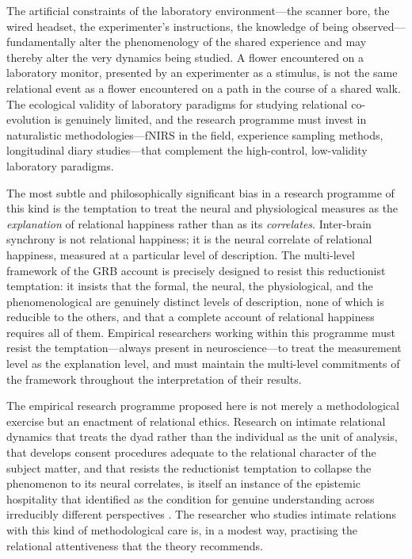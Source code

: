  The artificial constraints of the laboratory environment---the scanner bore, the wired headset, the experimenter's instructions, the knowledge of being observed---fundamentally alter the phenomenology of the shared experience and may thereby alter the very dynamics being studied. A flower encountered on a laboratory monitor, presented by an experimenter as a stimulus, is not the same relational event as a flower encountered on a path in the course of a shared walk. The ecological validity of laboratory paradigms for studying relational co-evolution is genuinely limited, and the research programme must invest in naturalistic methodologies---fNIRS in the field, experience sampling methods, longitudinal diary studies---that complement the high-control, low-validity laboratory paradigms.

 The most subtle and philosophically significant bias in a research programme of this kind is the temptation to treat the neural and physiological measures as the \emph{explanation} of relational happiness rather than as its \emph{correlates}. Inter-brain synchrony is not relational happiness; it is the neural correlate of relational happiness, measured at a particular level of description. The multi-level framework of the GRB account is precisely designed to resist this reductionist temptation: it insists that the formal, the neural, the physiological, and the phenomenological are genuinely distinct levels of description, none of which is reducible to the others, and that a complete account of relational happiness requires all of them. Empirical researchers working within this programme must resist the temptation---always present in neuroscience---to treat the measurement level as the explanation level, and must maintain the multi-level commitments of the framework throughout the interpretation of their results.

\begin{claim}
The empirical research programme proposed here is not merely a methodological exercise but an enactment of relational ethics. Research on intimate relational dynamics that treats the dyad rather than the individual as the unit of analysis, that develops consent procedures adequate to the relational character of the subject matter, and that resists the reductionist temptation to collapse the phenomenon to its neural correlates, is itself an instance of the epistemic hospitality that  identified as the condition for genuine understanding across irreducibly different perspectives \parencite{paperxiii}. The researcher who studies intimate relations with this kind of methodological care is, in a modest way, practising the relational attentiveness that the theory recommends.
\end{claim}

